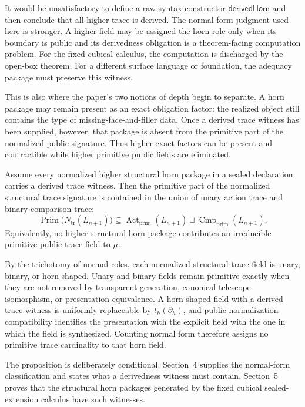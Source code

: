 \documentclass{lmcs}
\begin{document}
\begin{rem}
It would be unsatisfactory to define a raw syntax constructor
\(\mathsf{derivedHorn}\) and then conclude that all higher trace is derived.  The normal-form
judgment used here is stronger.  A higher field may be assigned the horn role only when its
boundary is public and its derivedness obligation is a theorem-facing computation problem.
For the fixed cubical calculus, the computation is discharged by the open-box theorem.  For a
different surface language or foundation, the adequacy package must preserve this witness.
\end{rem}

This is also where the paper's two notions of depth begin to separate.  A horn package may
remain present as an exact obligation factor: the realized object still contains the type of
missing-face-and-filler data.  Once a derived trace witness has been supplied, however,
that package is absent from the primitive part of the normalized public signature.  Thus
higher exact factors can be present and contractible while higher primitive public fields are
eliminated.

\begin{prop}
Assume every normalized higher structural horn package in a sealed declaration carries a
derived trace witness.  Then the primitive part of the normalized structural trace
signature is contained in the union of unary action trace and binary comparison trace:
\[
  \operatorname{Prim}\bigl(N_{\mathrm{tr}}(L_{n+1})\bigr)
  \subseteq
  \operatorname{Act}_{\mathrm{prim}}(L_{n+1})
  \sqcup
  \operatorname{Cmp}_{\mathrm{prim}}(L_{n+1}).
\]
Equivalently, no higher structural horn package contributes an irreducible primitive public
trace field to \(\mu\).
\end{prop}

By the trichotomy of normal roles, each normalized structural trace field is unary, binary, or
horn-shaped.  Unary and binary fields remain primitive exactly when they are not removed by
transparent generation, canonical telescope isomorphism, or presentation equivalence.  A
horn-shaped field with a derived trace witness is uniformly replaceable by
\(t_h(\partial_h)\), and public-normalization compatibility identifies the presentation with the
explicit field with the one in which the field is synthesized.  Counting normal form therefore
assigns no primitive trace cardinality to that horn field.

The proposition is deliberately conditional.  Section~4 supplies the normal-form
classification and states what a derivedness witness must contain.  Section~5 proves that the
structural horn packages generated by the fixed cubical sealed-extension calculus have such
witnesses.
\end{document}
